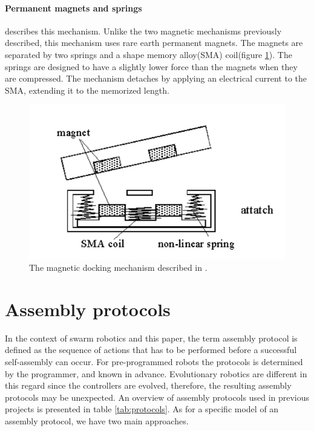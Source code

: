 \paragraph*{Permanent magnets and springs }
\cite{murata_hardware_2000} describes this mechanism.
Unlike the two magnetic mechanisms previously described, this mechanism uses rare earth permanent magnets.
The magnets are separated by two springs and a shape memory alloy(SMA) coil(figure \ref{fig:magnetic_mechanism}).
The springs are designed to have a slightly lower force than the magnets when they are compressed.
The mechanism detaches by applying an electrical current to the SMA, extending it to the memorized length.

\begin{figure}[H]
	
	\centering
	\includegraphics[width=\textwidth]{chapters/res/magnetic_mechanism.PNG}
	\caption{The magnetic docking mechanism described in \cite{murata_hardware_2000}.}
	\label{fig:magnetic_mechanism}
\end{figure}


\section{Assembly protocols}
\label{sec:protocol}
In the context of swarm robotics and this paper, the term assembly protocol is defined as the sequence of actions that has to be performed before a successful self-assembly can occur. 
For pre-programmed robots the protocols is determined by the programmer, and known in advance.
Evolutionary robotics are different in this regard since the controllers are evolved, therefore, the resulting assembly protocols may be unexpected. 
An overview of assembly protocols used in previous projects is presented in table \ref{tab:protocols}.
As for a specific model of an assembly protocol, we have two main approaches. 

